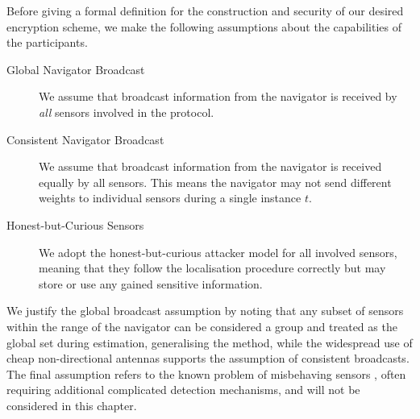 Before giving a formal definition for the construction and security of our desired encryption scheme, we make the following assumptions about the capabilities of the participants.
\begin{description}
    \item[Global Navigator Broadcast] We assume that broadcast information from the navigator is received by \textit{all} sensors involved in the protocol.
    \item[Consistent Navigator Broadcast] We assume that broadcast information from the navigator is received equally by all sensors. This means the navigator may not send different weights to individual sensors during a single instance $t$.
    \item[Honest-but-Curious Sensors] We adopt the honest-but-curious attacker model for all involved sensors, meaning that they follow the localisation procedure correctly but may store or use any gained sensitive information.
\end{description}
We justify the global broadcast assumption by noting that any subset of sensors within the range of the navigator can be considered a group and treated as the global set during estimation, generalising the method, while the widespread use of cheap non-directional antennas supports the assumption of consistent broadcasts. The final assumption refers to the known problem of misbehaving sensors \cite{lazosSeRLocSecureRangeIndependent2004,ben-galOutlierDetection2005}, often requiring additional complicated detection mechanisms, and will not be considered in this chapter.

